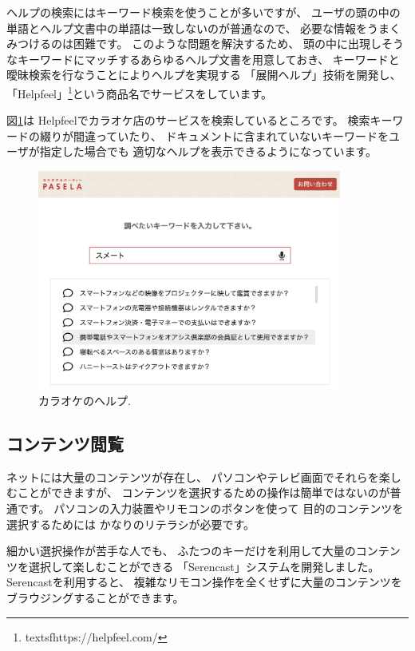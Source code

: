 \documentclass[topics]{compsoft} %
\begin{document}
ヘルプの検索にはキーワード検索を使うことが多いですが、
ユーザの頭の中の単語とヘルプ文書中の単語は一致しないのが普通なので、
必要な情報をうまくみつけるのは困難です\cite{10.1145/32206.32212}。
%
このような問題を解決するため、
頭の中に出現しそうなキーワードにマッチするあらゆるヘルプ文書を用意しておき、
キーワードと曖昧検索を行なうことによりヘルプを実現する
「展開ヘルプ」\cite{ExpandHelp}技術を開発し、
「Helpfeel」\footnote{
  textsf{https:{\slash}{\slash}helpfeel.com{\slash}}
}という商品名でサービスをしています。

図\ref{helpinquiry}は
Helpfeelでカラオケ店のサービスを検索しているところです。
検索キーワードの綴りが間違っていたり、
ドキュメントに含まれていないキーワードをユーザが指定した場合でも
適切なヘルプを表示できるようになっています。

\begin{figure}[t]
  \includegraphics[width=10cm,bb=0 0 1640 1188]{figures/4b2ca6d18537ec8d6922e0389324c3ea.png}
  \caption{カラオケのヘルプ.}
  \label{helpinquiry}
\end{figure}

\subsection{コンテンツ閲覧}

ネットには大量のコンテンツが存在し、
パソコンやテレビ画面でそれらを楽しむことができますが、
コンテンツを選択するための操作は簡単ではないのが普通です。
パソコンの入力装置やリモコンのボタンを使って
目的のコンテンツを選択するためには
かなりのリテラシが必要です。

細かい選択操作が苦手な人でも、
ふたつのキーだけを利用して大量のコンテンツを選択して楽しむことができる
「Serencast」システムを開発しました\cite{Serencast}。
Serencastを利用すると、
複雑なリモコン操作を全くせずに大量のコンテンツをブラウジングすることができます。
\end{document}
